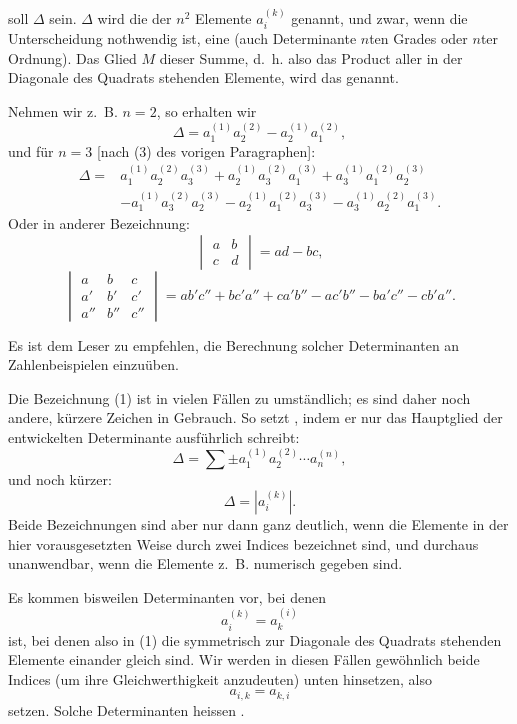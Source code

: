 
soll \(\Delta\) sein. \(\Delta\) wird die  der \(n^2\) Elemente \(a_i^{(k)}\) genannt, und zwar, wenn die Unterscheidung nothwendig ist, eine  (auch Determinante \(n\)ten Grades oder \(n\)ter Ordnung). Das Glied \(M\) dieser Summe, d.~h. also das Product aller in der Diagonale des Quadrats stehenden Elemente, wird das  genannt.

Nehmen wir z.~B. \(n=2\), so erhalten wir
\begin{equation}
\Delta=a_1^{(1)}a_2^{(2)}-a_2^{(1)}a_1^{(2)},
\tag{4}
\end{equation}
und für \(n=3\) [nach (3) des vorigen Paragraphen]:
\begin{equation}
\begin{aligned}
\Delta={}&a_1^{(1)}a_2^{(2)}a_3^{(3)}
+a_2^{(1)}a_3^{(2)}a_1^{(3)}
+a_3^{(1)}a_1^{(2)}a_2^{(3)}\\
&-a_1^{(1)}a_3^{(2)}a_2^{(3)}
-a_2^{(1)}a_1^{(2)}a_3^{(3)}
-a_3^{(1)}a_2^{(2)}a_1^{(3)}.
\end{aligned}
\tag{5}
\end{equation}
Oder in anderer Bezeichnung:
\begin{equation}
\begin{vmatrix}
a&b\\
c&d
\end{vmatrix}
=ad-bc,
\tag{6}
\end{equation}
\begin{equation}
\begin{vmatrix}
a&b&c\\
a'&b'&c'\\
a''&b''&c''
\end{vmatrix}
=ab'c''+bc'a''+ca'b''-ac'b''-ba'c''-cb'a''.
\tag{7}
\end{equation}

Es ist dem Leser zu empfehlen, die Berechnung solcher Determinanten an Zahlenbeispielen einzuüben.

Die Bezeichnung (1) ist in vielen Fällen zu umständlich; es sind daher noch andere, kürzere Zeichen in Gebrauch. So setzt , indem er nur das Hauptglied der entwickelten Determinante ausführlich schreibt:
\begin{equation}
\Delta=\sum \pm a_1^{(1)}a_2^{(2)}\cdots a_n^{(n)},
\tag{8}
\end{equation}
und  noch kürzer:
\begin{equation}
\Delta=\left|a_i^{(k)}\right|.
\tag{9}
\end{equation}
Beide Bezeichnungen sind aber nur dann ganz deutlich, wenn die Elemente in der hier vorausgesetzten Weise durch zwei Indices bezeichnet sind, und durchaus unanwendbar, wenn die Elemente z.~B. numerisch gegeben sind.

Es kommen bisweilen Determinanten vor, bei denen
\[
 a_i^{(k)}=a_k^{(i)}
\]
ist, bei denen also in (1) die symmetrisch zur Diagonale des Quadrats stehenden Elemente einander gleich sind. Wir werden in diesen Fällen gewöhnlich beide Indices (um ihre Gleichwerthigkeit anzudeuten) unten hinsetzen, also
\[
 a_{i,k}=a_{k,i}
\]
setzen. Solche Determinanten heissen .
